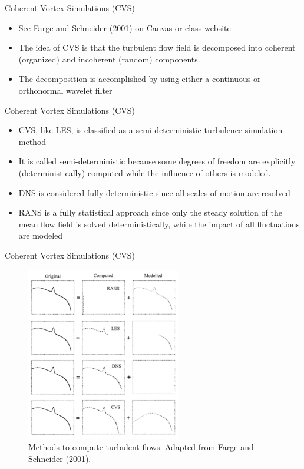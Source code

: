 \begin{frame}{Coherent Vortex Simulations (CVS)}

\begin{itemize}
	\item See Farge and Schneider (2001) on Canvas or class website
	\item The idea of CVS is that the turbulent flow field is decomposed into coherent (organized) and incoherent (random) components.
	\item The decomposition is accomplished by using either a continuous or orthonormal wavelet filter
\end{itemize}

\end{frame}


\begin{frame}{Coherent Vortex Simulations (CVS)}

\begin{itemize}
	\item CVS, like LES, is classified as a semi-deterministic turbulence simulation method
	\item It is called semi-deterministic because some degrees of freedom are explicitly (deterministically) computed while the influence of others is modeled.
	\item DNS is considered fully deterministic since all scales of motion are resolved
	\item RANS is a fully statistical approach since only the steady solution of the mean flow field is solved deterministically, while the impact of all fluctuations are modeled
\end{itemize}

\end{frame}


\begin{frame}{Coherent Vortex Simulations (CVS)}
\begin{figure}
	\includegraphics[width=0.6\textwidth]{cvs1}
	\caption{Methods to compute turbulent flows. Adapted from Farge and Schneider (2001).}
\end{figure}
\end{frame}

